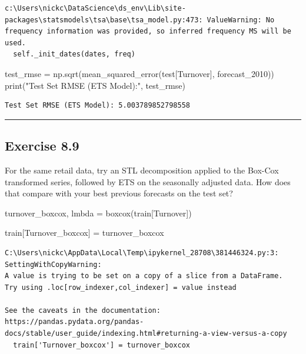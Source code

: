 \documentclass[
  11pt,
]{article}
\newenvironment{Shaded}{\begin{snugshade}}{\end{snugshade}}
\newcommand{\BuiltInTok}[1]{\textcolor[rgb]{0.00,0.23,0.31}{#1}}
\newcommand{\NormalTok}[1]{\textcolor[rgb]{0.00,0.23,0.31}{#1}}
\newcommand{\OperatorTok}[1]{\textcolor[rgb]{0.37,0.37,0.37}{#1}}
\newcommand{\StringTok}[1]{\textcolor[rgb]{0.13,0.47,0.30}{#1}}
\begin{document}
\begin{verbatim}
c:\Users\nickc\DataScience\ds_env\Lib\site-packages\statsmodels\tsa\base\tsa_model.py:473: ValueWarning: No frequency information was provided, so inferred frequency MS will be used.
  self._init_dates(dates, freq)
\end{verbatim}

\begin{Shaded}
\begin{Highlighting}[]
\NormalTok{test\_rmse }\OperatorTok{=}\NormalTok{ np.sqrt(mean\_squared\_error(test[}\StringTok{\textquotesingle{}Turnover\textquotesingle{}}\NormalTok{], forecast\_2010))}
\BuiltInTok{print}\NormalTok{(}\StringTok{"Test Set RMSE (ETS Model):"}\NormalTok{, test\_rmse)}
\end{Highlighting}
\end{Shaded}

\begin{verbatim}
Test Set RMSE (ETS Model): 5.003789852798558
\end{verbatim}

\begin{center}\rule{0.5\linewidth}{0.5pt}\end{center}

\subsection{Exercise 8.9}\label{exercise-8.9}

For the same retail data, try an STL decomposition applied to the
Box-Cox transformed series, followed by ETS on the seasonally adjusted
data. How does that compare with your best previous forecasts on the
test set?

\begin{Shaded}
\begin{Highlighting}[]
\NormalTok{turnover\_boxcox, lmbda }\OperatorTok{=}\NormalTok{ boxcox(train[}\StringTok{\textquotesingle{}Turnover\textquotesingle{}}\NormalTok{])}

\NormalTok{train[}\StringTok{\textquotesingle{}Turnover\_boxcox\textquotesingle{}}\NormalTok{] }\OperatorTok{=}\NormalTok{ turnover\_boxcox}
\end{Highlighting}
\end{Shaded}

\begin{verbatim}
C:\Users\nickc\AppData\Local\Temp\ipykernel_28708\381446324.py:3: SettingWithCopyWarning: 
A value is trying to be set on a copy of a slice from a DataFrame.
Try using .loc[row_indexer,col_indexer] = value instead

See the caveats in the documentation: https://pandas.pydata.org/pandas-docs/stable/user_guide/indexing.html#returning-a-view-versus-a-copy
  train['Turnover_boxcox'] = turnover_boxcox
\end{verbatim}
\end{document}
